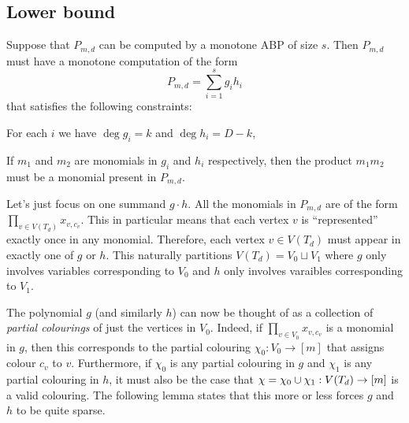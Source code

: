 \subsection{Lower bound}

Suppose that $P_{m,d}$ can be computed by a monotone ABP of size $s$. Then $P_{m,d}$ must have a monotone computation of the form
\[
P_{m,d} = \sum_{i=1}^s g_i h_i
\]
that satisfies the following constraints:
\begin{description}
  \itemsep 0pt
\item [Degree constraints] For each $i$ we have $\deg g_i = k$ and $\deg h_i = D - k$,
\item [Monotonicity] If $m_1$ and $m_2$ are monomials in $g_i$ and $h_i$ respectively, then the product $m_1m_2$ must be a monomial present in $P_{m,d}$.
\end{description}

Let's just focus on one summand $g \cdot h$.
All the monomials in $P_{m,d}$ are of the form $\prod_{v\in V(T_d)}{x_{v,c_v}}$. This in particular means that each vertex $v$ is ``represented'' exactly once in any monomial. Therefore, each vertex $v\in V(T_d)$ must appear in exactly one of $g$ or $h$. This naturally partitions $V(T_d) = V_0 \sqcup V_1$ where $g$ only involves variables corresponding to $V_0$ and $h$ only involves varaibles corresponding to $V_1$.

The polynomial $g$ (and similarly $h$) can now be thought of as a collection of \emph{partial colourings} of just the vertices in $V_0$. Indeed, if $\prod_{v\in V_0} x_{v,c_v}$ is a monomial in $g$, then this corresponds to the partial colouring $\chi_0: V_0 \rightarrow [m]$ that assigns colour $c_v$ to $v$. Furthermore, if $\chi_0$ is any partial colouring in $g$ and $\chi_1$ is any partial colouring in $h$, it must also be the case that $\chi = \chi_0 \cup \chi_1:V(T_d)\rightarrow[m]$ is a valid colouring. The following lemma states that this more or less forces $g$ and $h$ to be quite sparse.

